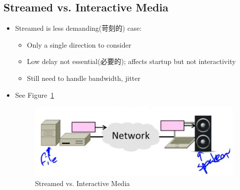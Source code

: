 \documentclass[12pt]{ctexart}   %
\begin{document}
	\subsection{Streamed vs. Interactive Media}
	\begin{itemize}
		\item Streamed is less demanding(苛刻的) case:
		\begin{itemize}
			\item Only a single direction to consider
			\item Low delay not essential(必要的); affects startup but not interactivity
			\item Still need to handle bandwidth, jitter
		\end{itemize}
		\item See Figure~\ref{fig:9-3-1}
		  
		 \begin{figure}[h!] %
		\centering
		 \includegraphics[scale=0.7]{images/9-3-1}
		\caption{ Streamed vs. Interactive Media }
		 \label{fig:9-3-1}
		 \end{figure}
	\end{itemize}
	
\end{document}
